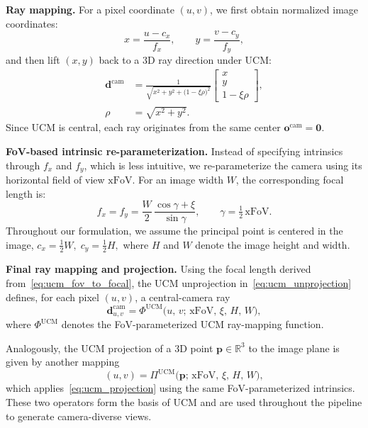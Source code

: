 \textbf{Ray mapping.}
For a pixel coordinate \((u,v)\), we first obtain normalized image coordinates:
\begin{equation}
x = \frac{u - c_x}{f_x},
\qquad
y = \frac{v - c_y}{f_y},
\label{eq:ucm_normcoord}
\end{equation}
and then lift \((x,y)\) back to a 3D ray direction under UCM:
\begin{equation}
\begin{aligned}
\bm{d}^{\mathrm{cam}}
&=
\frac{1}{\sqrt{x^{2} + y^{2} + \big(1 - \xi \rho\big)^{2}}}
\begin{bmatrix}
x \\[2pt] y \\[2pt] 1 - \xi \rho
\end{bmatrix},\\[6pt]
\rho
&= \sqrt{x^{2} + y^{2}}.
\end{aligned}
\label{eq:ucm_unprojection}
\end{equation}
Since UCM is central, each ray originates from the same center \(\bm{o}^{\mathrm{cam}} = \bm{0}\).

\textbf{FoV-based intrinsic re-parameterization.}
Instead of specifying intrinsics through \(f_x\) and \(f_y\), which is less intuitive, we re-parameterize the camera using its horizontal field of view \(\mathrm{xFoV}\).
For an image width \(W\), the corresponding focal length is:
\begin{equation}
f_x = f_y
=
\frac{W}{2}\,
\frac{\cos\gamma + \xi}{\sin\gamma},
\qquad
\gamma = \tfrac{1}{2}\,\mathrm{xFoV}.
\label{eq:ucm_fov_to_focal}
\end{equation}
Throughout our formulation, we assume the principal point is centered in the image,
\(
c_x = \tfrac{1}{2}W,\;
c_y = \tfrac{1}{2}H,
\)
where \(H\) and \(W\) denote the image height and width.

\textbf{Final ray mapping and projection.}
Using the focal length derived from~\cref{eq:ucm_fov_to_focal}, the UCM unprojection in~\cref{eq:ucm_unprojection} defines, for each pixel \((u,v)\), a central-camera ray
\begin{equation}
\bm{d}^{\mathrm{cam}}_{u,v}
=
\Phi^{\mathrm{UCM}}\!\big(u,\,v;\, \mathrm{xFoV},\, \xi,\, H,\, W\big),
\label{eq:ucm_final_ray}
\end{equation}
where \(\Phi^{\mathrm{UCM}}\) denotes the FoV-parameterized UCM ray-mapping function.

Analogously, the UCM projection of a 3D point
\(\bm{p}\in\mathbb{R}^3\)
to the image plane is given by another mapping
\begin{equation}
(u,v)
=
\Pi^{\mathrm{UCM}}\!\big(\bm{p};\, \mathrm{xFoV},\, \xi,\, H,\, W\big),
\label{eq:ucm_projection_operator}
\end{equation}
which applies~\cref{eq:ucm_projection} using the same FoV-parameterized intrinsics.
These two operators form the basis of UCM and are used throughout the pipeline to generate camera-diverse views.

